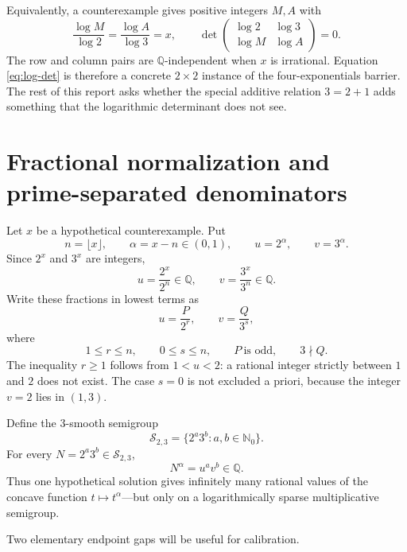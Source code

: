 \documentclass[11pt,oneside]{article}
\theoremstyle{definition}
\theoremstyle{remark}
\newcommand{\Nzero}{\mathbb N_0}
\newcommand{\Q}{\mathbb Q}
\newcommand{\Ssmooth}{\mathcal S_{2,3}}
\begin{document}
Equivalently, a counterexample gives positive integers $M,A$ with
\begin{equation}\label{eq:log-det}
 \frac{\log M}{\log2}=\frac{\log A}{\log3}=x,
 \qquad
 \det\begin{pmatrix}\log2&\log3\\ \log M&\log A\end{pmatrix}=0.
\end{equation}
The row and column pairs are $\Q$-independent when $x$ is irrational.  Equation
\eqref{eq:log-det} is therefore a concrete $2\times2$ instance of the four-exponentials
barrier.  The rest of this report asks whether the special additive relation $3=2+1$ adds
something that the logarithmic determinant does not see.

\section{Fractional normalization and prime-separated denominators}

Let $x$ be a hypothetical counterexample.  Put
\begin{equation}\label{eq:frac-normalization}
 n=\lfloor x\rfloor,\qquad \alpha=x-n\in(0,1),\qquad
 u=2^\alpha,\qquad v=3^\alpha.
\end{equation}
Since $2^x$ and $3^x$ are integers,
\[
 u=\frac{2^x}{2^n}\in\Q,
 \qquad
 v=\frac{3^x}{3^n}\in\Q.
\]
Write these fractions in lowest terms as
\begin{equation}\label{eq:uv-reduced}
 u=\frac{P}{2^r},\qquad v=\frac{Q}{3^s},
\end{equation}
where
\begin{equation}\label{eq:rs-conditions}
 1\le r\le n,
 \qquad 0\le s\le n,
 \qquad P\ \text{is odd},
 \qquad 3\nmid Q.
\end{equation}
The inequality $r\ge1$ follows from $1<u<2$: a rational integer strictly between $1$ and $2$
does not exist.  The case $s=0$ is not excluded a priori, because the integer $v=2$ lies in
$(1,3)$.

Define the $3$-smooth semigroup
\[
 \Ssmooth=\{2^a3^b:a,b\in\Nzero\}.
\]
For every $N=2^a3^b\in\Ssmooth$,
\begin{equation}\label{eq:s-smooth-rationality}
 N^\alpha=u^av^b\in\Q.
\end{equation}
Thus one hypothetical solution gives infinitely many rational values of the concave function
$t\mapsto t^\alpha$---but only on a logarithmically sparse multiplicative semigroup.

Two elementary endpoint gaps will be useful for calibration.
\end{document}
